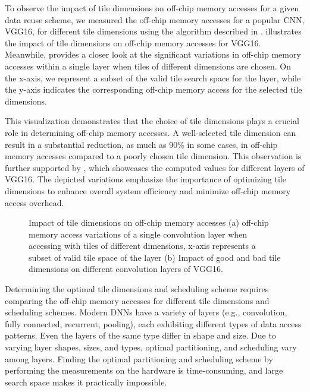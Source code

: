 To observe the impact of tile dimensions on off-chip memory accesses for a given data reuse scheme, we measured the off-chip memory accesses for a popular CNN, VGG16, for different tile dimensions using the algorithm described in .  illustrates the impact of tile dimensions on off-chip memory accesses for VGG16. Meanwhile,  provides a closer look at the significant variations in off-chip memory accesses within a single layer when tiles of different dimensions are chosen. On the x-axis, we represent a subset of the valid tile search space for the layer, while the y-axis indicates the corresponding off-chip memory access for the selected tile dimensions.

This visualization demonstrates that the choice of tile dimensions plays a crucial role in determining off-chip memory accesses. A well-selected tile dimension can result in a substantial reduction, as much as 90\% in some cases, in off-chip memory accesses compared to a poorly chosen tile dimension. This observation is further supported by , which showcases the computed values for different layers of VGG16. The depicted variations emphasize the importance of optimizing tile dimensions to enhance overall system efficiency and minimize off-chip memory access overhead.

\begin{figure}[!h]
	\centering
	\captionsetup{font=sf}
	\hfil	
	\hfil	
	\caption{Impact of tile dimensions on off-chip memory accesses (a) off-chip memory access variations of a single convolution layer when accessing with tiles of different dimensions, x-axis represents a subset of valid tile space of the layer (b) Impact of good and bad tile dimensions on different convolution layers of VGG16.}
	\label{fig:impactOfTileDims}
\end{figure}

Determining the optimal tile dimensions and scheduling scheme requires comparing the off-chip memory accesses for different tile dimensions and scheduling schemes. Modern DNNs have a variety of layers (e.g., convolution, fully connected, recurrent, pooling), each exhibiting different types of data access patterns. Even the layers of the same type differ in shape and size. Due to varying layer shapes, sizes, and types, optimal partitioning, and scheduling vary among layers. Finding the optimal partitioning and scheduling scheme by performing the measurements on the hardware is time-consuming, and large search space makes it practically impossible.

